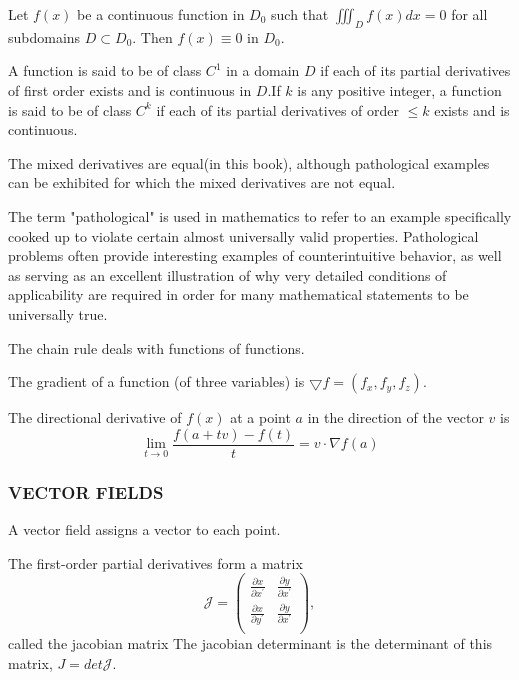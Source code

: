 \documentclass[hazy,blue,11pt]{elegantnote}
\begin{document}
\begin{theorem}
    Let $f(x)$ be a continuous function in $D_0$  such that $\iiint_{D}f(x)dx=0$ for all subdomains $D \subset D_0$. Then $f(x)\equiv 0$ in $D_0$.   
\end{theorem}

\begin{definition}[class $C^k$]
    A function is said to be of class $C^1$ in a domain $D$ if each of its partial
derivatives of first order exists and is continuous in $D$.If $k$ is any positive
integer, a function is said to be of class $C^k$ if each of its partial derivatives of order $\le k$ exists and is continuous.
\end{definition}

The mixed derivatives are equal(in this book), although pathological examples can be exhibited for which the mixed derivatives are not equal.
\begin{note}
    The term "pathological" is used in mathematics to refer to an example specifically cooked up to violate certain almost universally valid properties. Pathological problems often provide interesting examples of counterintuitive behavior, as well as serving as an excellent illustration of why very detailed conditions of applicability are required in order for many mathematical statements to be universally true.
\end{note}

The chain rule deals with functions of functions.

\begin{definition}[gradient]
    The gradient of a function (of three variables) is $\bigtriangledown f=(f_x,f_y,f_z)$.
\end{definition}

\begin{definition}
    The directional derivative of $f(x)$ at a point $a$ in the direction of the vector $v$ is
    \begin{equation}
        \lim _{t \rightarrow 0} \frac{f(a+tv)-f(t)}t=v\cdot \nabla f(a)
    \end{equation}
\end{definition}

\subsubsection{VECTOR FIELDS}
A vector ﬁeld assigns a vector to each point.
\begin{definition}
    The first-order partial derivatives form a matrix
    \begin{equation}
        \mathscr{J}=\left(\begin{matrix}{\frac{\partial x}{\partial x^{\prime}}}&{\frac{\partial y}{\partial x^{\prime}}}\\ {\frac{\partial x}{\partial y^{\prime}}}&{\frac{\partial y}{\partial x^{\prime}}}\\ \end{matrix}\right),
    \end{equation}
    called the jacobian matrix
    The jacobian determinant is the determinant of this matrix, $J = det \mathscr{J}$.
\end{definition}
\end{document}
